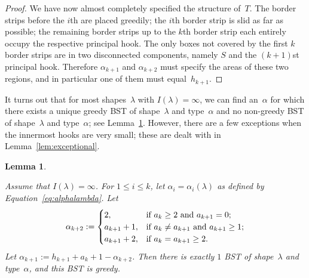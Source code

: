 \documentclass[12pt]{article}
\newtheorem{lemma}{Lemma}
\theoremstyle{definition}
\begin{document}
\begin{proof}
We have now almost completely specified the structure of~$T$.
The border strips before the $i$th are placed greedily;
the $i$th border strip is slid as far as possible;
the remaining border strips up to the $k$th border strip
each entirely occupy the respective principal hook.
The only boxes not covered by the first $k$ border strips
are in two disconnected components, namely $S$
and the $(k+1)$st principal hook.
Therefore $\alpha_{k+1}$ and $\alpha_{k+2}$
must specify the areas of these two regions,
and in particular one of them must equal~$h_{k+1}$.
\end{proof}


It turns out that for most shapes~$\lambda$ with $I(\lambda)=\infty$,
we can find an~$\alpha$ for which there exists a unique greedy BST
of shape~$\lambda$ and type~$\alpha$ and no non-greedy BST
of shape~$\lambda$ and type~$\alpha$; see Lemma~\ref{lem:no_nongreedy}.
However, there are a few exceptions
when the innermost hooks are very small;
these are dealt with in Lemma~\ref{lem:exceptional}.

\begin{lemma}
\label{lem:no_nongreedy}

Assume that $I(\lambda)=\infty$.
For $1 \le i \le k$, let $\alpha_i = \alpha_i(\lambda)$
as defined by Equation~\eqref{eq:alphalambda}.
Let
\begin{equation*}
\alpha_{k+2} :=
\begin{cases}
2, & \mbox{{\rm if} $a_k \ge 2$ {\rm and} $a_{k+1}=0${\rm ;}} \\
a_{k+1}+1, & \mbox{{\rm if} $a_k \ne a_{k+1}$ {\rm and} $a_{k+1} \ge 1${\rm ;}} \\
a_{k+1}+2, & \mbox{{\rm if} $a_k = a_{k+1} \ge 2$.}
\end{cases}
\end{equation*}
Let $\alpha_{k+1} := h_{k+1} + a_k + 1 - \alpha_{k+2}$.
Then there is exactly $1$ BST of shape~$\lambda$ and type~$\alpha$,
and this BST is greedy.
\end{lemma}
\end{document}
